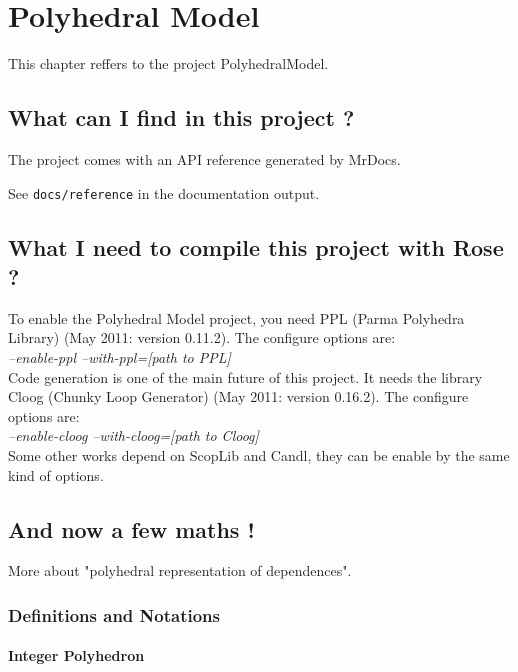 \chapter{Polyhedral Model}
\label{polyhedric:polyhedric}

	This chapter reffers to the project PolyhedralModel.

	\section{What can I find in this project ?}
	\label{polyhedric:insideproject}
	
	The project comes with an API reference generated by MrDocs.
	
	See \texttt{docs/reference} in the documentation output.
	
	\section{What I need to compile this project with Rose ?}
	\label{polyhedric:getstarted}

	To enable the Polyhedral Model project, you need PPL (Parma Polyhedra Library) (May 2011: version 0.11.2). The configure options are: \\
	\emph{--enable-ppl --with-ppl=[path to PPL]}\\
	
	Code generation is one of the main future of this project. It needs the library Cloog (Chunky Loop Generator) (May 2011: version 0.16.2). The configure options are: \\
	\emph{--enable-cloog --with-cloog=[path to Cloog]}\\
	
	Some other works depend on ScopLib and Candl, they can be enable by the same kind of options.

	\section{And now a few maths !}
	\label{polyhedric:maths}

More about "polyhedral representation of dependences".

		\subsection{Definitions and Notations}
		\label{polyhedric:maths:defs}

			\subsubsection{Integer Polyhedron}
			\label{polyhedric:maths:defs:polyhedron}

